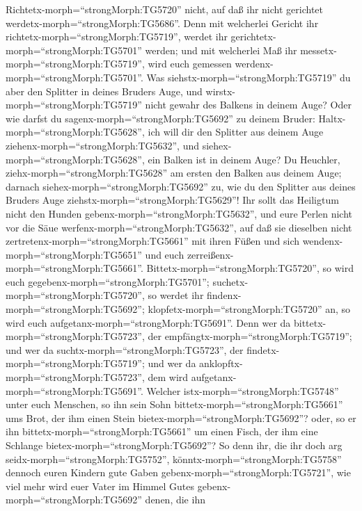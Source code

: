  Richtetx-morph=``strongMorph:TG5720'' nicht, auf daß ihr
nicht gerichtet werdetx-morph=``strongMorph:TG5686''.  Denn
mit welcherlei Gericht ihr richtetx-morph=``strongMorph:TG5719'', werdet
ihr gerichtetx-morph=``strongMorph:TG5701'' werden; und mit welcherlei
Maß ihr messetx-morph=``strongMorph:TG5719'', wird euch gemessen
werdenx-morph=``strongMorph:TG5701''.  Was
siehstx-morph=``strongMorph:TG5719'' du aber den Splitter in deines
Bruders Auge, und wirstx-morph=``strongMorph:TG5719'' nicht gewahr des
Balkens in deinem Auge?  Oder wie darfst du
sagenx-morph=``strongMorph:TG5692'' zu deinem Bruder:
Haltx-morph=``strongMorph:TG5628'', ich will dir den Splitter aus deinem
Auge ziehenx-morph=``strongMorph:TG5632'', und
siehex-morph=``strongMorph:TG5628'', ein Balken ist in deinem Auge?
 Du Heuchler, ziehx-morph=``strongMorph:TG5628'' am ersten
den Balken aus deinem Auge; darnach siehex-morph=``strongMorph:TG5692''
zu, wie du den Splitter aus deines Bruders Auge
ziehstx-morph=``strongMorph:TG5629''!  Ihr sollt das
Heiligtum nicht den Hunden gebenx-morph=``strongMorph:TG5632'', und eure
Perlen nicht vor die Säue werfenx-morph=``strongMorph:TG5632'', auf daß
sie dieselben nicht zertretenx-morph=``strongMorph:TG5661'' mit ihren
Füßen und sich wendenx-morph=``strongMorph:TG5651'' und euch
zerreißenx-morph=``strongMorph:TG5661''. 
Bittetx-morph=``strongMorph:TG5720'', so wird euch
gegebenx-morph=``strongMorph:TG5701'';
suchetx-morph=``strongMorph:TG5720'', so werdet ihr
findenx-morph=``strongMorph:TG5692'';
klopfetx-morph=``strongMorph:TG5720'' an, so wird euch
aufgetanx-morph=``strongMorph:TG5691''.  Denn wer da
bittetx-morph=``strongMorph:TG5723'', der
empfängtx-morph=``strongMorph:TG5719''; und wer da
suchtx-morph=``strongMorph:TG5723'', der
findetx-morph=``strongMorph:TG5719''; und wer da
anklopftx-morph=``strongMorph:TG5723'', dem wird
aufgetanx-morph=``strongMorph:TG5691''.  Welcher
istx-morph=``strongMorph:TG5748'' unter euch Menschen, so ihn sein Sohn
bittetx-morph=``strongMorph:TG5661'' ums Brot, der ihm einen Stein
bietex-morph=``strongMorph:TG5692''?  oder, so er ihn
bittetx-morph=``strongMorph:TG5661'' um einen Fisch, der ihm eine
Schlange bietex-morph=``strongMorph:TG5692''?  So denn ihr,
die ihr doch arg seidx-morph=``strongMorph:TG5752'',
könntx-morph=``strongMorph:TG5758'' dennoch euren Kindern gute Gaben
gebenx-morph=``strongMorph:TG5721'', wie viel mehr wird euer Vater im
Himmel Gutes gebenx-morph=``strongMorph:TG5692'' denen, die ihn
